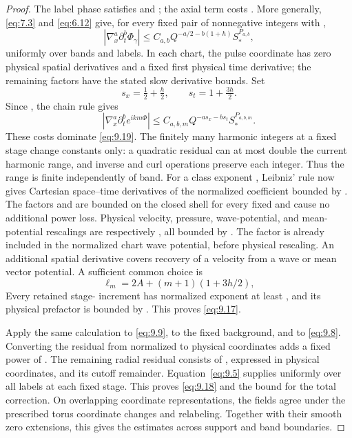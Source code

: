 \begin{proof}
The label phase satisfies
 and
; the axial term
 costs
. More generally, \eqref{eq:7.3} and
\eqref{eq:6.12} give, for every fixed pair of nonnegative integers
 with ,
\[
|\nabla_x^a\partial_t^b\Phi_\gamma|
 \le C_{a,b}Q^{-a/2-b(1+h)}S_*^{P_{a,b}},
\]
uniformly over bands and labels. In each chart, the pulse coordinate has zero physical spatial
derivatives and a fixed first physical time derivative; the remaining factors have the stated slow
derivative bounds. Set
\[
s_x=\tfrac12+\tfrac h2,
\qquad
s_t=1+\tfrac{3h}{2}.
\]
Since , the chain rule gives
\[
|\nabla_x^a\partial_t^b e^{ikm\Phi}|
 \le C_{a,b,m}Q^{-as_x-bs_t}S_*^{P_{a,b,m}}.
\]
These costs dominate \eqref{eq:9.19}. The finitely many harmonic integers at a fixed stage change
constants only: a quadratic residual can at most double the current harmonic range, and inverse and
curl operations preserve each integer. Thus the range is finite independently of band.
%
For a class exponent , Leibniz' rule now gives Cartesian space--time
derivatives of the normalized coefficient bounded by
. The factors
 and
 are bounded on the closed shell for every fixed
 and cause no additional power loss. Physical velocity, pressure,
wave-potential, and mean-potential rescalings are respectively
, all bounded by
. The factor  is already included in
the normalized chart wave potential, before physical rescaling. An additional spatial derivative
covers recovery of a velocity from a wave or mean vector potential. A sufficient common choice is
\[
\ell_m=2A+(m+1)(1+3h/2),
\]
Every retained stage- increment has normalized exponent at least
, and its physical prefactor is bounded by
. This proves \eqref{eq:9.17}.

Apply the same calculation to \eqref{eq:9.9}, to the fixed background, and to \eqref{eq:9.8}.
Converting the residual from normalized to physical coordinates adds a fixed power of
. The remaining radial residual consists of
, expressed in physical coordinates, and its cutoff remainder.
Equation~\eqref{eq:9.5} supplies  uniformly over all labels at each
fixed stage. This proves \eqref{eq:9.18} and the bound for the total correction. On overlapping
coordinate representations, the fields agree under the prescribed torus coordinate changes and
relabeling. Together with their smooth zero extensions, this gives the estimates across support and
band boundaries.
\end{proof}


